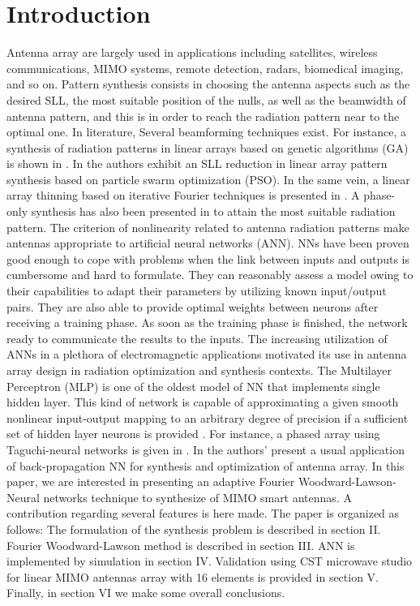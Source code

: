\documentclass[conference]{IEEEtran}
\begin{document}
\section{Introduction} 

Antenna array are largely used in applications including satellites, wireless communications, MIMO systems, remote detection, radars, biomedical imaging, and so on. Pattern synthesis consists in choosing the antenna aspects such as the desired SLL, the most suitable position of the nulls, as well as the beamwidth of antenna pattern, and this is in order to reach the  radiation pattern near to the optimal one. In literature, Several beamforming techniques exist. For instance, a synthesis of radiation patterns in linear arrays based on genetic algorithms (GA) is shown in \cite{art1}. In \cite{art2} the authors exhibit an SLL reduction in linear array pattern synthesis based on particle swarm optimization (PSO). In the same vein, a linear array thinning based on iterative Fourier techniques is presented in \cite{art6}. A phase-only synthesis has also been presented in \cite{art7} to attain the most suitable radiation pattern. The criterion of nonlinearity related to antenna radiation patterns make antennas appropriate to artificial neural networks (ANN). NNs have been proven good enough to cope with problems when the link between inputs and outputs is cumbersome and hard to formulate. They can reasonably assess a model owing to their capabilities to adapt their parameters by utilizing known input/output pairs. They are also able to provide optimal weights between neurons after receiving a training phase. As soon as the training phase is finished, the network ready to communicate the results to the inputs. The increasing utilization of ANNs in a plethora of electromagnetic applications motivated its use in antenna array design in radiation optimization and synthesis contexts. The Multilayer Perceptron (MLP) is one of the oldest model of NN that implements single hidden layer. This kind of network is capable of approximating a given smooth nonlinear input-output mapping to an arbitrary degree of precision if a sufficient set of hidden layer neurons is provided \cite{art10}. For instance, a phased array using Taguchi-neural networks is given in \cite{art12}. In \cite{art20} the authors’ present a usual application of back-propagation NN for synthesis and optimization of antenna array. In this paper, we are interested in presenting an adaptive Fourier Woodward-Lawson-Neural networks technique to synthesize of MIMO smart antennas. A contribution regarding several features is here made. The paper is organized as follows: The formulation of the synthesis problem is described in section II. Fourier Woodward-Lawson method is described in section III. ANN is implemented by simulation in section IV. Validation using CST microwave studio for linear MIMO antennas array with 16 elements is provided in section V. Finally, in section VI we make some overall conclusions.
\end{document}
